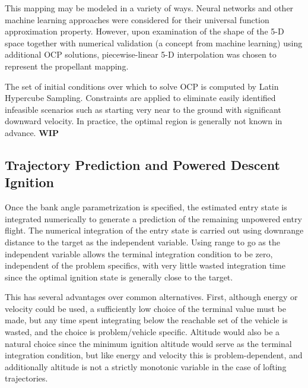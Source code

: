 \documentclass[letterpaper, preprint, paper,11pt]{AAS}
\begin{document}
This mapping may be modeled in a variety of ways. Neural networks and other machine learning approaches were considered for their universal function approximation property. However, upon examination of the shape of the 5-D space together with numerical validation (a concept from machine learning) using additional OCP solutions, piecewise-linear 5-D interpolation was chosen to represent the propellant mapping.

The set of initial conditions over which to solve OCP is computed by Latin Hypercube Sampling. Constraints are applied to eliminate easily identified infeasible scenarios such as starting very near to the ground with significant downward velocity. In practice, the optimal region is generally not known in advance. 
\textbf{WIP}
 

\subsection{Trajectory Prediction and Powered Descent Ignition}
Once the bank angle parametrization is specified, the estimated entry state is integrated numerically to generate a prediction of the remaining unpowered entry flight. The numerical integration of the entry state is carried out using downrange distance to the target as the independent variable. Using range to go as the independent variable allows the terminal integration condition to be zero, independent of the problem specifics, with very little wasted integration time since the optimal ignition state is generally close to the target. 

This has several advantages over common alternatives. First, although energy or velocity could be used, a sufficiently low choice of the terminal value must be made, but any time spent integrating below the reachable set of the vehicle is wasted, and the choice is problem/vehicle specific. Altitude would also be a natural choice since the minimum ignition altitude would serve as the terminal integration condition, but like energy and velocity this is problem-dependent, and additionally altitude is not a strictly monotonic variable in the case of lofting trajectories.
\end{document}
